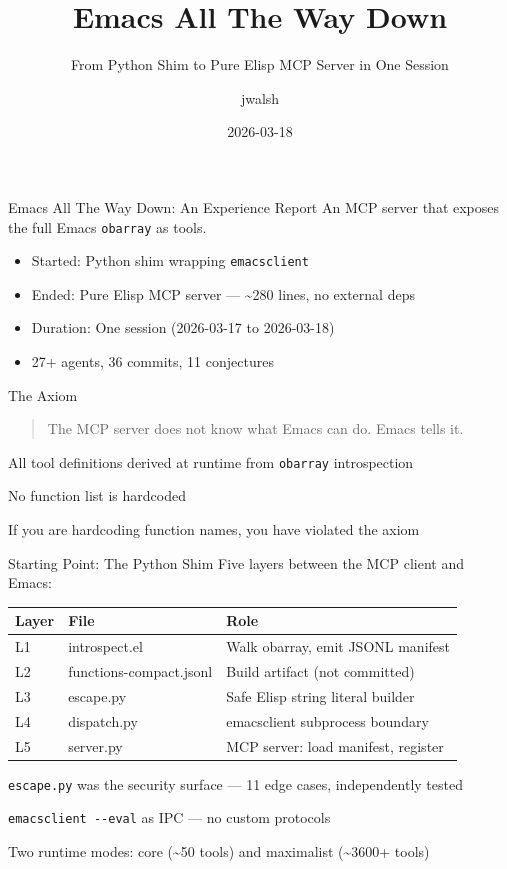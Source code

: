\documentclass[presentation]{beamer}
\author{jwalsh}
\date{2026-03-18}
\title{Emacs All The Way Down}
\subtitle{From Python Shim to Pure Elisp MCP Server in One Session}
\begin{document}
\maketitle
\begin{frame}[label={sec:org6bdf072},fragile]{Emacs All The Way Down: An Experience Report}
 An MCP server that exposes the full Emacs \texttt{obarray} as tools.

\begin{itemize}
\item Started: Python shim wrapping \texttt{emacsclient}
\item Ended: Pure Elisp MCP server --- \textasciitilde{}280 lines, no external deps
\item Duration: One session (2026-03-17 to 2026-03-18)
\item 27+ agents, 36 commits, 11 conjectures
\end{itemize}
\end{frame}
\begin{frame}[label={sec:org8bc7a73},fragile]{The Axiom}
 \begin{quote}
The MCP server does not know what Emacs can do. Emacs tells it.
\end{quote}
\begin{block}{All tool definitions derived at runtime from \texttt{obarray} introspection}
\end{block}
\begin{block}{No function list is hardcoded}
\end{block}
\begin{block}{If you are hardcoding function names, you have violated the axiom}
\end{block}
\end{frame}
\begin{frame}[label={sec:org4ec31fc},fragile]{Starting Point: The Python Shim}
 Five layers between the MCP client and Emacs:

\begin{center}
\begin{tabular}{lll}
Layer & File & Role\\
\hline
L1 & introspect.el & Walk obarray, emit JSONL manifest\\
L2 & functions-compact.jsonl & Build artifact (not committed)\\
L3 & escape.py & Safe Elisp string literal builder\\
L4 & dispatch.py & emacsclient subprocess boundary\\
L5 & server.py & MCP server: load manifest, register\\
\end{tabular}
\end{center}
\begin{block}{\texttt{escape.py} was the security surface --- 11 edge cases, independently tested}
\end{block}
\begin{block}{\texttt{emacsclient -{}-{}eval} as IPC --- no custom protocols}
\end{block}
\begin{block}{Two runtime modes: core (\textasciitilde{}50 tools) and maximalist (\textasciitilde{}3600+ tools)}
\end{block}
\end{frame}
\end{document}
